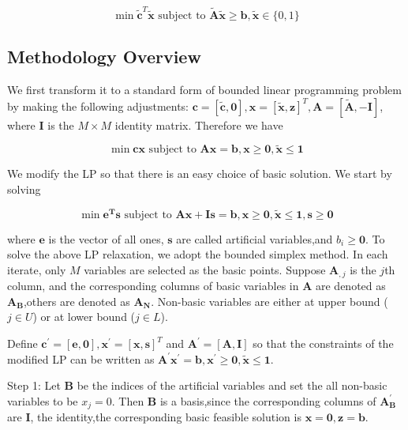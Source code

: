 \documentclass{article}
\begin{document}
\begin{equation*}
\min \tilde{\mathbf{c}}^T\tilde{\mathbf{x}}\textrm{ subject to } \tilde{\mathbf{A}}\tilde{\mathbf{x}}\geq \mathbf{b}, \tilde{\mathbf{x}}\in \{0,1\}
\end{equation*}

\subsection{Methodology Overview}
We first transform it to a standard form of bounded linear programming problem by making the following adjustments: $\mathbf{c}=[\tilde{\mathbf{c}},\mathbf{0}],\mathbf{x}=[\tilde{\mathbf{x}},\mathbf{z}]^T,\mathbf{A}=[\tilde{\mathbf{A}},-\mathbf{I}]$, where $\mathbf{I}$ is the $M\times M$ identity matrix. Therefore we have

\begin{equation}
\min \mathbf{cx} \textrm{ subject to } \mathbf{Ax} = \mathbf{b}, \mathbf{x}\geq \mathbf{0},\tilde{\mathbf{x}} \leq \mathbf{1}
\end{equation}

We modify the LP so that there is an easy choice of basic solution. We start by solving

\begin{equation}
\min \mathbf{e^{T}s} \textrm{ subject to } \mathbf{Ax} + \mathbf{Is} = \mathbf{b}, \mathbf{x}\geq \mathbf{0},\tilde{\mathbf{x}} \leq \mathbf{1},\mathbf{s}\geq \mathbf{0}
\end{equation}

where $\mathbf{e}$ is the vector of all ones, $\mathbf{s}$ are called artificial variables,and $b_{i}\geq \mathbf{0}$.
To solve the above LP relaxation, we adopt the bounded simplex method. In each iterate, only $M$ variables are selected as the basic points. Suppose $\mathbf{A}_{,j}$ is the $j$th column, and the corresponding columns of basic variables in $\mathbf{A}$ are denoted as $\mathbf{A_B}$,others are denoted as $\mathbf{A_N}$. Non-basic variables are either at upper bound ($j \in U$) or at lower bound ($j\in L$).

Define $\mathbf{c^{'}}=[\mathbf{e},\mathbf{0}], \mathbf{x}^{'} = [\mathbf{x},\mathbf{s}]^T$ and $\mathbf{A}^{'} = [\mathbf{A},\mathbf{I}]$ so that the constraints of the modified LP can be written as $\mathbf{A}^{'}\mathbf{x}^{'} = \mathbf{b}, \mathbf{x}^{'} \geq \mathbf{0},\tilde{\mathbf{x}} \leq \mathbf{1}$.

Step 1: Let $\mathbf{B}$ be the indices of the artificial variables and set the all non-basic variables to be $x_j=0$. Then $\mathbf{B}$ is a basis,since the corresponding columns of $\mathbf{A_B^{'}}$ are $\mathbf{I}$, the identity,the corresponding basic feasible solution is $\mathbf{x} = \mathbf{0}, \mathbf{z} = \mathbf{b}$.
\end{document}
